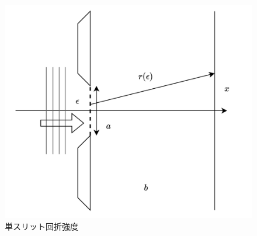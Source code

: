 \begin{figure}[htbp]
	\centering
	\includegraphics[width=0.5\linewidth]{src/figures/result/signle_slit_amp_explain.png}
	\caption{単スリット回折強度}
	\label{fig:single_slit_amp_explain}
\end{figure}
